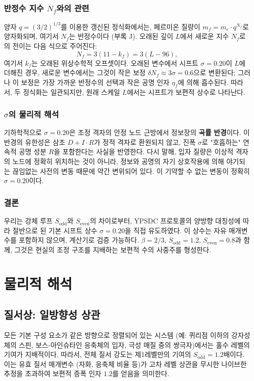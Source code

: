 \documentclass[11pt,a4paper]{article}
\begin{document}
	\subsubsection{반정수 지수 \(N_f\)와의 관련}
	
	양자 \(q = (3/2)^{1/3}\)를 이용한 갱신된 정식화에서는, 페르미온 질량이 \(m_f = m_e \cdot q^{N_f}\)로 양자화되며, 여기서 \(N_f\)는 반정수이다 (부록 J). 오래된 깊이 \(L\)에서 새로운 지수 \(N_f\)로의 전이는 다음 식으로 주어진다:
	\[
	N_f = 3(11 - k_f) = 3(L - 96),
	\]
	여기서 \(k_f\)는 오래된 위상수학적 오프셋이다. 오래된 변수에서 시프트 \(\sigma = 0.20\)이 \(L\)에 더해진 경우, 새로운 변수에서는 그것이 작은 보정 \(\delta N_f \approx 3\sigma = 0.6\)으로 변환된다; 그러나 이 보정은 가장 가까운 반정수의 선택과 작은 공명 인자 \(\eta_f\)에 의해 흡수된다. 따라서, 두 정식화는 일관되지만, 원래 스케일 \(L\)에서는 시프트가 보편적 상수로 나타난다.
	
	\subsubsection{\(\sigma\)의 물리적 해석}
	
	기하학적으로 \(\sigma = 0.20\)은 조정 격자의 안정 노드 근방에서 정보장의 \textbf{곡률 반경}이다. 이 반경의 유한성은 삼조 \(D+I\cdot R\)가 정적 격자로 환원되지 않고, 진폭 \(\sigma\)로 "호흡하는" 연속적 공명 성분 \(R\)을 포함한다는 사실을 반영한다. 다시 말해, 입자 질량은 이상적 격자의 노드에 정확히 위치하는 것이 아니라, 정보와 공명의 자기 상호작용에 의해 야기되는 끊임없는 사전의 변동 때문에 약간 변위되어 있다. 이 기약할 수 없는 변동이 정확히 \(\sigma = 0.20\)이다.
	
	\subsubsection{결론}
	
	우리는 강체 루프 \(S_{\mathrm{odd}}\)와 \(S_{\mathrm{even}}\)의 차이로부터, YPSDC 프로토콜의 양방향 대칭성에 따라 절반으로 된 기본 시프트 상수 \(\sigma = 0.20\)을 직접 유도하였다. 이 상수는 자유 매개변수를 포함하지 않으며, 계산기로 검증 가능하다. \(\beta = 2/3\), \(S_{\mathrm{odd}} = 1.2\), \(S_{\mathrm{even}} = 0.8\)과 함께, 그것은 현실의 조정 구조를 지배하는 보편적 수의 사중주를 형성한다.
	
	\section{물리적 해석}
	
	\subsection{질서상: 일방향성 상관}
	모든 기본 구성 요소가 같은 방향으로 정렬되어 있는 시스템 (예: 퀴리점 이하의 강자성체의 스핀, 보스-아인슈타인 응축체의 입자, 극성 매질 중의 쌍극자)에서는 홀수 레벨의 기여가 지배적이다. 따라서, 전체 질서 강도는 제1레벨만의 기여의 \(S_{\text{odd}} = 1.2\)배이다. 이는 유효 질서 매개변수 (자화, 응축체 비율 등)가 고차 레벨 상관을 무시한 나이브한 추정을 초과하여 보편적 증폭 인자 \(1.2\)를 얻음을 의미한다.
	
\end{document}
